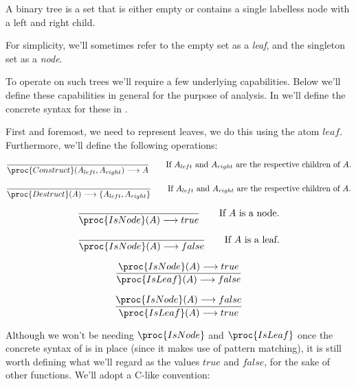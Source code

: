 \begin{definition}

A binary tree is a set that is either empty or contains a single labelless node
with a left and right child.

\end{definition}

For simplicity, we'll sometimes refer to the empty set as a \emph{leaf}, and
the singleton set as a \emph{node}.

To operate on such trees we'll require a few underlying capabilities. Below
we'll define these capabilities in general for the purpose of analysis. In
 we'll define the concrete syntax for these in
.

First and foremost, we need to represent leaves, we do this using the atom
$leaf$. Furthermore, we'll define the following operations:

\begin{equation}
{
{}\over{
\proc{Construct}(A_{left}, A_{right})
\longrightarrow
A
}}
\ \ \ \ \ \ \text{If $A_{left}$ and $A_{right}$ are the respective children
of $A$.}
\end{equation}

\begin{equation}
{
{}\over{
\proc{Destruct}(A)
\longrightarrow
\{A_{left},A_{right}\}
}}
\ \ \ \ \ \ \text{If $A_{left}$ and $A_{right}$ are the respective children
of $A$.}
\end{equation}

\begin{equation}
{
{}\over{
\proc{IsNode}(A)
\longrightarrow
true
}}
\ \ \ \ \ \ \text{If $A$ is a node.}
\end{equation}

\begin{equation}
{
{}\over{
\proc{IsNode}(A)
\longrightarrow
false
}}
\ \ \ \ \ \ \text{If $A$ is a leaf.}
\end{equation}

\begin{equation}
{
{
\proc{IsNode}(A)
\longrightarrow
true
}\over{
\proc{IsLeaf}(A)
\longrightarrow
false
}}
\end{equation}

\begin{equation}
{
{
\proc{IsNode}(A)
\longrightarrow
false
}\over{
\proc{IsLeaf}(A)
\longrightarrow
true
}}
\end{equation}

Although we won't be needing $\proc{IsNode}$ and $\proc{IsLeaf}$ once the
concrete syntax of  is in place (since it makes use of pattern
matching), it is still worth defining what we'll regard as the values $true$
and $false$, for the sake of other functions. We'll adopt a C-like convention:

